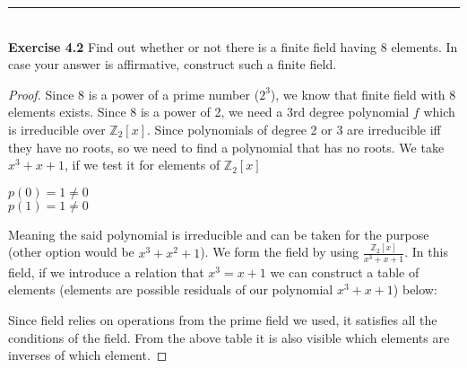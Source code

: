 \documentclass{article}
\begin{document}
\noindent\rule{12cm}{0.4pt}\\
\noindent \textbf{Exercise 4.2} Find out whether or not there is a finite field having 8 elements. In case your answer is affirmative, construct such a finite field.
\begin{proof}
Since 8 is a power of a prime number ($2^3$), we know that finite field with 8 elements exists. Since 8 is a power of 2, we need a 3rd degree polynomial $f$ which is irreducible over $\mathbb{Z}_{2}[x]$. Since polynomials of degree 2 or 3 are irreducible iff they have no roots, so we need to find a polynomial that has no roots. We take $x^3 + x + 1$, if we test it for elements of $\mathbb{Z}_{2}[x]$
\begin{center}
$p(0) = 1 \neq 0$\\
$p(1) = 1 \neq 0$	
\end{center}
Meaning the said polynomial is irreducible and can be taken for the purpose (other option would be $x^3 + x^2 + 1$). We form the field by using $\frac{\mathbb{Z}_{2}[x]}{x^3 + x + 1}$. In this field, if we introduce a relation that $x^3 = x + 1$ we can construct a table of elements (elements are possible residuals of our polynomial $x^3 + x + 1$) below:
\begin{center}
\centering
{}
\end{center}
Since field relies on operations from the prime field we used, it satisfies all the conditions of the field. From the above table it is also visible which elements are inverses of which element.
\end{proof}
\end{document}
